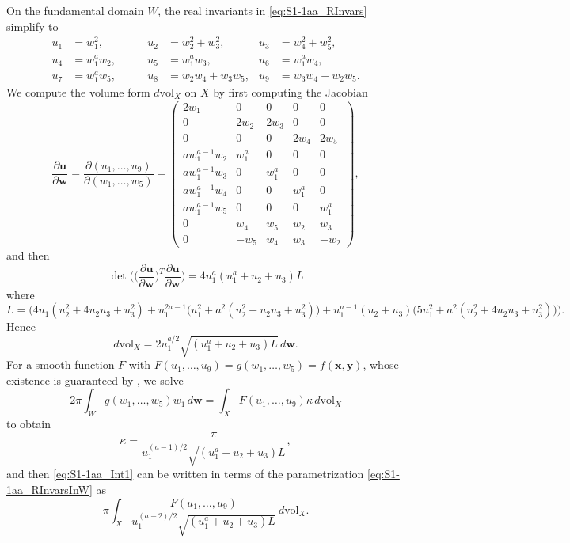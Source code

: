 \documentclass[twoside]{amsart}
\theoremstyle{definition}
\theoremstyle{remark}
\numberwithin{equation}{section}
\newcommand{\vol}{\text{vol}}
\begin{document}
On the fundamental domain $W$, the real invariants in \eqref{eq:S1-1aa_RInvars} simplify to
\begin{equation}
\label{eq:S1-1aa_RInvarsInW}
\begin{aligned}
    u_1 &=      w_1^2,
    &
    u_2 &=      w_2^2 + w_3^2,
    &u_3 &=     w_4^2 + w_5^2,
    \\
    u_4 &=      w_1^a w_2,
    \qquad
    &
    u_5 &=      w_1^a w_3,
    \qquad
    &
    u_6 &=      w_1^a w_4,
    \\
    u_7 &=      w_1^a w_5,
    &
    u_8 &=      w_2 w_4 + w_3 w_5,
    &
    u_9 &=      w_3 w_4 - w_2 w_5.
\end{aligned}
\end{equation}
We compute the volume form $d\vol_X$ on $X$ by first computing the Jacobian
\[
    \frac{\partial\mathbf{u}}{\partial\mathbf{w}} = \frac{\partial (u_1,\ldots,u_9)}{\partial (w_1,\ldots,w_5)}
    =
    \begin{pmatrix}
        2 w_1 & 0 & 0 & 0 & 0 \\
        0 & 2 w_2 & 2 w_3 & 0 & 0 \\
        0 & 0 & 0 & 2 w_4 & 2 w_5 \\
        a w_1^{a-1} w_2  & w_1^a & 0 & 0 & 0 \\
        a w_1^{a-1} w_3 & 0 & w_1^a & 0 & 0 \\
        a w_1^{a-1} w_4 & 0 & 0 & w_1^a & 0 \\
        a w_1^{a-1} w_5 & 0 & 0 & 0 & w_1^a \\
        0 & w_4 & w_5 & w_2 & w_3 \\
        0 & -w_5 & w_4 & w_3 & -w_2
    \end{pmatrix},
\]
and then
\[
    \det \Bigg( \Big(\frac{\partial\mathbf{u}}{\partial\mathbf{w}}\Big)^T \frac{\partial\mathbf{u}}{\partial\mathbf{w}} \Bigg) 
    =
    4 u_1^a (u_1^a + u_2 + u_3) L
\]
where
\[
    L
    =   \Big(
        4 u_1 (u_2^2 + 4 u_2 u_3 + u_3^2) + u_1^{2a - 1} \big( u_1^2 + a^2 (u_2^2 + u_2 u_3 + u_3^2)\big)
        + u_1^{a - 1} (u_2 + u_3) \big(5 u_1^2 + a^2 (u_2^2 + 4 u_2 u_3 + u_3^2)\big)
        \Big).
\]
Hence
\[
    d\vol_X
    =
    2 u_1^{a/2} \sqrt{ (u_1^a + u_2 + u_3) L }
        \, d\mathbf{w}.
\]
For a smooth function $F$ with $F(u_1, \ldots, u_9) = g(w_1, \ldots, w_5) = f(\mathbf{x}, \mathbf{y})$, whose existence is guaranteed by
\cite[Thrm.~1]{GWSdiff}, we solve
\[
    2\pi \int_W g(w_1, \ldots, w_5) w_1 \, d\mathbf{w}
    =
    \int_X F(u_1, \ldots, u_9) \kappa \, d\vol_X
\]
to obtain
\[
    \kappa
    =
    \frac{\pi}{
        u_1^{(a-1)/2} \sqrt{ (u_1^a + u_2 + u_3) L }
        },
\]
and then \eqref{eq:S1-1aa_Int1} can be written in terms of the parametrization \eqref{eq:S1-1aa_RInvarsInW} as
\begin{equation}
\label{eq:S1-1aa_Int2}
    \pi \int_X \frac{F(u_1, \ldots, u_9)}
                    {u_1^{(a-2)/2} \sqrt{ (u_1^a + u_2 + u_3) L }} \, d\vol_X .
\end{equation}
\end{document}
